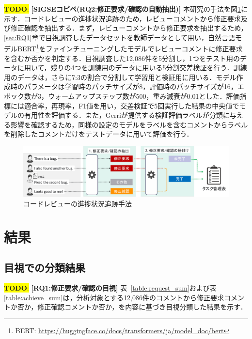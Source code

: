 \documentclass[11pt]{jreport}
\newcommand{\todo}[1]{\colorbox{yellow}{{\bf TODO}:}{\color{red} {\textbf{[#1]}}}}
\begin{document}
\todo{SIGSEコピペ(RQ2:修正要求/確認の自動抽出)}
本研究の手法を図\ref{fig:research_method}に示す．コードレビューの進捗状況追跡のため，レビューコメントから修正要求及び修正確認を抽出する．まず，レビューコメントから修正要求を抽出するため，\ref{sec:RQ1}章で目視調査したデータセットを教師データとして用い，自然言語モデルBERT\footnote{BERT: \url{https://huggingface.co/docs/transformers/ja/model_doc/bert}}をファインチューニングしたモデルでレビューコメントに修正要求を含むか否かを判定する．目視調査した12,086件を5分割し，1つをテスト用のデータに用いて，残りの4つを訓練用のデータに用いる5分割交差検証を行う．訓練用のデータは，さらに7:3の割合で分割して学習用と検証用に用いる．モデル作成時のパラメータは学習時のパッチサイズが8，評価時のパッチサイズが16，エポック数が3，ウォームアップステップ数が500，重み減衰が0.01とした．評価指標には適合率，再現率，F1値を用い，交差検証で5回実行した結果の中央値でモデルの有用性を評価する．また，Gerriが提供する検証評価ラベルが分類に与える影響を確認するため，同様の設定のモデルをラベルを含むコメントからラベルを削除したコメントだけをテストデータに用いて評価を行う．

\begin{figure}[t]
\centerline{\includegraphics[width=1.0\linewidth]{@BSthesis2024_Kawasaki/BSthesis2024_Kawasaki_fig/research_method.pdf}}
\caption{コードレビューの進捗状況追跡手法}
\label{fig:research_method}
\end{figure}

\section{結果}
\subsection{目視での分類結果}

\todo{RQ1:修正要求/確認の目視}
表~\ref{table:request_sum}および表\ref{table:achieve_sum}は，分析対象とする12,086件のコメントから修正要求コメントか否か，修正確認コメントか否か，を内容に基づき目視分類した結果を示す．
\end{document}
